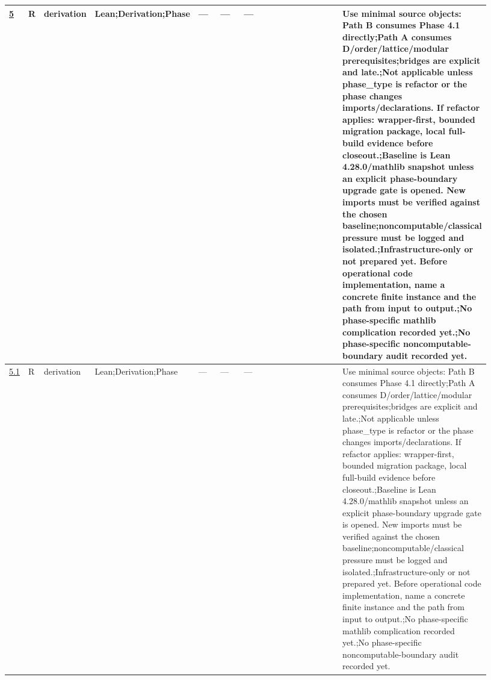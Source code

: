 \begin{longtable}{L{0.026\linewidth} L{0.024\linewidth} L{0.045\linewidth} L{0.07\linewidth} L{0.065\linewidth} L{0.075\linewidth} L{0.11\linewidth} L{0.19\linewidth} L{0.155\linewidth} L{0.17\linewidth}}
\hyperlink{phase-row-5}{5} & R & derivation & Lean;\newline Derivation;\newline Phase & --- & --- & --- &  &  & Use minimal source objects: Path B consumes Phase 4.1 directly;\newline Path A consumes D/\allowbreak{}order/\allowbreak{}lattice/\allowbreak{}modular prerequisites;\newline bridges are explicit and late.;\newline Not applicable unless phase\_type is refactor or the phase changes imports/\allowbreak{}declarations. If refactor applies: wrapper-first, bounded migration package, local full-build evidence before closeout.;\newline Baseline is Lean 4.28.0/\allowbreak{}mathlib snapshot unless an explicit phase-boundary upgrade gate is opened. New imports must be verified against the chosen baseline;\newline noncomputable/\allowbreak{}classical pressure must be logged and isolated.;\newline Infrastructure-only or not prepared yet. Before operational code implementation, name a concrete finite instance and the path from input to output.;\newline No phase-specific mathlib complication recorded yet.;\newline No phase-specific noncomputable-boundary audit recorded yet.\\
\hline
\addlinespace[0.24em]
\hyperlink{phase-row-5-1}{5.1} & R & derivation & Lean;\newline Derivation;\newline Phase & --- & --- & --- &  &  & Use minimal source objects: Path B consumes Phase 4.1 directly;\newline Path A consumes D/\allowbreak{}order/\allowbreak{}lattice/\allowbreak{}modular prerequisites;\newline bridges are explicit and late.;\newline Not applicable unless phase\_type is refactor or the phase changes imports/\allowbreak{}declarations. If refactor applies: wrapper-first, bounded migration package, local full-build evidence before closeout.;\newline Baseline is Lean 4.28.0/\allowbreak{}mathlib snapshot unless an explicit phase-boundary upgrade gate is opened. New imports must be verified against the chosen baseline;\newline noncomputable/\allowbreak{}classical pressure must be logged and isolated.;\newline Infrastructure-only or not prepared yet. Before operational code implementation, name a concrete finite instance and the path from input to output.;\newline No phase-specific mathlib complication recorded yet.;\newline No phase-specific noncomputable-boundary audit recorded yet.\\

\end{longtable}
